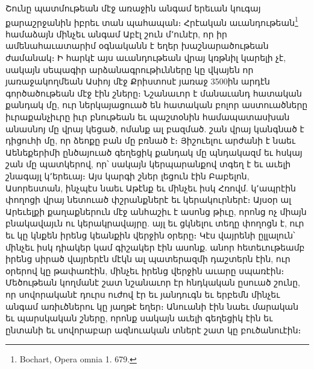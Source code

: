 \documentclass{article}
\begin{document}
{Շունը պատմութեան մէջ առաջին անգամ երեւան կուգայ քարաշրջանին իբրեւ տան պահապան։ Հրէական աւանդութեան\footnote{Bochart, Opera omnia 1. 679.} համաձայն մինչեւ անգամ Աբէլ շուն մ՚ունէր, որ իր ամենահաւատարիմ օգնականն է եղեր խաշնարածութեան ժամանակ։ Ի հարկէ այս աւանդութեան վրայ կռթնիլ կարելի չէ, սակայն սեպագիր արձանագրութիւնները կը վկայեն որ յառաջակողմեան Ասիոյ մէջ Քրիստոսէ յառաջ 3500ին արդէն գործածութեան մէջ էին շները։ Նշանաւոր է մանաւանդ հատական քանդակ մը, ուր ներկայացուած են հատական բոլոր աստուածները իւրաքանչիւրը իւր բնութեան եւ պաշտօնին համապատասխան անասնոյ մը վրայ կեցած, ոմանք ալ բազմած. շան վրայ կանգնած է դիցուհի մը, որ ձեոքը բան մը բռնած է։ Յիշուելու արժանի է նաեւ Աենեքերիմի ընծայուած գեղեցիկ քանդակ մը պնդակազմ եւ հսկայ շան մը պատկերով, որ՝ սակայն կերպարանքով տգեղ է եւ աւելի շնագայլ կ՚երեւայ։ Այս կարգի շներ լեցուն էին Բաբելոն, Ասորեստան, ինչպէս նաեւ Աթէնք եւ մինչեւ իսկ Հռովմ. կ՚ապրէին փողոցի վրայ նետուած փշրանքներէ եւ կերակուրներէ։ Այսօր ալ Արեւելքի քաղաքներուն մէջ անհաշիւ է ասոնց թիւը, որոնց ոչ միայն բնակավայւն ու կերակրավայրը. այլ եւ ցկնելու տեղը փողոցն է, ուր եւ կը կնքեն իրենց կեանքին վերջին օրերը։ Կէս վայրենի ըլլալուն՝ մինչեւ իսկ դիակեր կամ գիշակեր էին ասոնք. անոր հետեւութեամբ իրենց սիրած վայրերէն մէկն ալ պատերազմի դաշտերն էին, ուր օրերով կը թափառէին, մինչեւ իրենց վերջին աւարը սպառէին։ Մեծութեան կողմանէ շատ նշանաւոր էր հնդկական ըսուած շունը, որ սովորականէ դուրս ուժով էր եւ յանդուգն եւ երբեմն մինչեւ անգամ առիւծներու կը յաղթէ եղեր։ Անուանի էին նաեւ մարական եւ պարսկական շները, որոնք սակայն աւելի գեղեցիկ էին եւ ընտանի եւ սովորաբար ազնուական տներէ շատ կը բուծանուէին։

}
\end{document}
